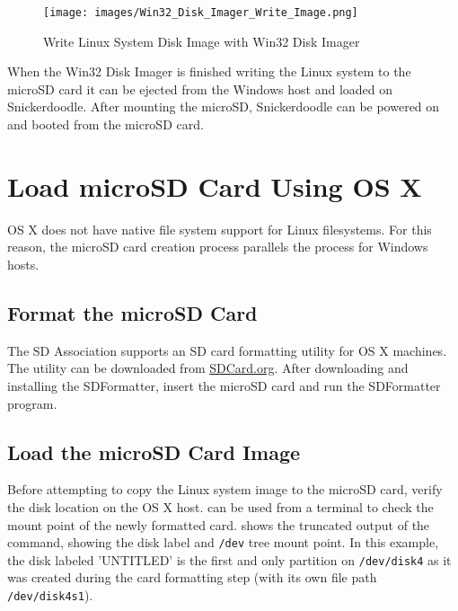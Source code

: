 \begin{figure}
	\centering
	\texttt{[image: images/Win32\_Disk\_Imager\_Write\_Image.png]}
	\caption{Write Linux System Disk Image with Win32 Disk Imager}
	\label{fig:win32diskimagewrite}
\end{figure}


When the Win32 Disk Imager is finished writing the Linux system to the microSD card it can be ejected from the Windows host and loaded on Snickerdoodle. After mounting the microSD, Snickerdoodle can be powered on and booted from the microSD card. %

\section{Load microSD Card Using OS X}


OS X does not have native file system support for Linux filesystems. For this reason, the microSD card creation process parallels the process for Windows hosts. 


\subsection{Format the microSD Card}

The SD Association supports an SD card formatting utility for OS X machines. The utility can be downloaded from \href{https://www.sdcard.org/downloads/formatter_4}{SDCard.org}. After downloading and installing the SDFormatter, insert the microSD card and run the SDFormatter program. 





\subsection{Load the microSD Card Image}

Before attempting to copy the Linux system image to the microSD card, verify the disk location on the OS X host.  can be used from a terminal to check the mount point of the newly formatted card.  shows the truncated output of the  command, showing the disk label and \texttt{/dev} tree mount point. In this example, the disk labeled 'UNTITLED' is the first and only partition on \texttt{/dev/disk4} as it was created during the card formatting step (with its own file path \texttt{/dev/disk4s1}). 


